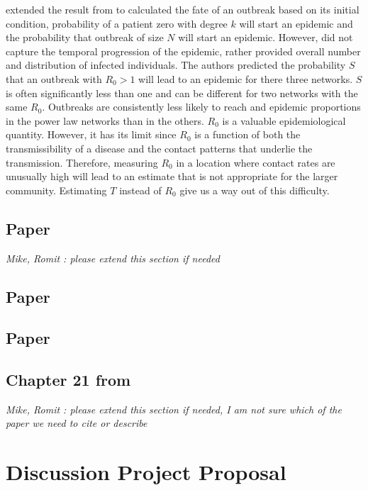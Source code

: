 \documentclass[12pt, journal,onecolumn]{IEEEtran}
\begin{document}
 \cite{meyers2005network} extended the result from \cite{newman2002spread} to calculated the fate of an outbreak based on its initial condition, probability of a patient zero with degree $k$ will start an epidemic and the probability that outbreak of size $N$ will start an epidemic. However, \cite{newman2002spread} did not capture the temporal progression of the epidemic, rather provided overall number and distribution of infected individuals. The authors predicted the probability $S$ that an outbreak with $R_0>1$ will lead to an epidemic for there three networks. $S$ is often significantly less than one and can be different for two networks with the same $R_0$. Outbreaks are consistently less likely to reach and epidemic proportions in the power law networks than in the others. $R_0$ is a valuable epidemiological quantity. However, it has its limit since $R_0$ is a function of both the transmissibility of a disease and the contact patterns that underlie the transmission. Therefore, measuring $R_0$ in a location where contact rates are unusually high will lead to an estimate that is not appropriate for the larger community.  Estimating $T$ instead of $R_0$ give us a way out of this difficulty. 


\subsection{Paper \cite{keeling2005networks}}


\bigskip 
{\em{Mike, Romit : please extend this section if needed}}


\subsection{Paper \cite{meltzer2014estimating}}
\subsection{Paper \cite{myers2012information}}
\subsection{Chapter 21 from \cite{easley2010networks}}

\bigskip
{\em{Mike, Romit : please extend this section if needed, I am not sure which of the paper we need to cite or describe}}


\section{Discussion Project Proposal}
\label{sec:ProjectProposal}
\end{document}
